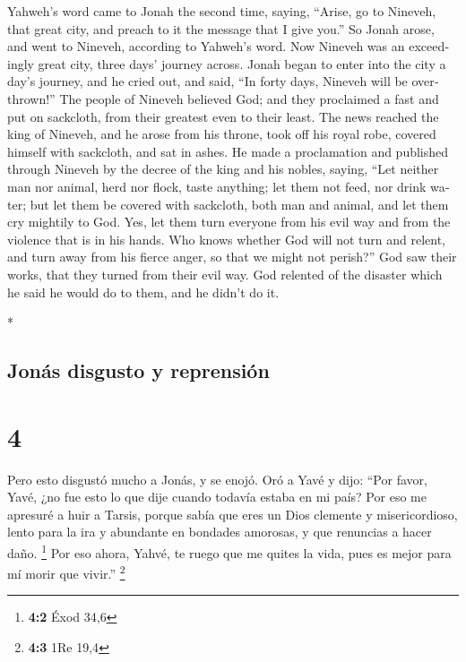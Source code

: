 \begin{paracol}{2}
\begin{otherlanguage}{english}
 Yahweh's word came to Jonah the second time, saying,
 ``Arise, go to Nineveh, that great city, and preach to it
the message that I give you.''  So Jonah arose, and went
to Nineveh, according to Yahweh's word. Now Nineveh was an exceedingly
great city, three days' journey across.  Jonah began to
enter into the city a day's journey, and he cried out, and said, ``In
forty days, Nineveh will be overthrown!''  The people of
Nineveh believed God; and they proclaimed a fast and put on sackcloth,
from their greatest even to their least.  The news reached
the king of Nineveh, and he arose from his throne, took off his royal
robe, covered himself with sackcloth, and sat in ashes. 
He made a proclamation and published through Nineveh by the decree of
the king and his nobles, saying, ``Let neither man nor animal, herd nor
flock, taste anything; let them not feed, nor drink water;
 but let them be covered with sackcloth, both man and
animal, and let them cry mightily to God. Yes, let them turn everyone
from his evil way and from the violence that is in his hands.
 Who knows whether God will not turn and relent, and turn
away from his fierce anger, so that we might not perish?''
 God saw their works, that they turned from their evil
way. God relented of the disaster which he said he would do to them, and
he didn't do it.

\end{otherlanguage}

\switchcolumn[0]*

\hypertarget{jonuxe1s-disgusto-y-reprensiuxf3n}{%
\subsection{Jonás disgusto y
reprensión}\label{jonuxe1s-disgusto-y-reprensiuxf3n}}

\hypertarget{section-6}{%
\section{4}\label{section-6}}

 Pero esto disgustó mucho a Jonás, y se enojó.
 Oró a Yavé y dijo: ``Por favor, Yavé, ¿no fue esto lo que
dije cuando todavía estaba en mi país? Por eso me apresuré a huir a
Tarsis, porque sabía que eres un Dios clemente y misericordioso, lento
para la ira y abundante en bondades amorosas, y que renuncias a hacer
daño. \footnote{\textbf{4:2} Éxod 34,6}  Por eso ahora,
Yahvé, te ruego que me quites la vida, pues es mejor para mí morir que
vivir.'' \footnote{\textbf{4:3} 1Re 19,4}


\end{paracol}
